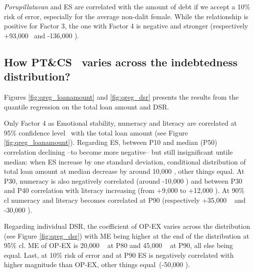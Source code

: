 \documentclass[a4paper, 11pt, onecolumn]{article}
\newcommand{\sd}{standard deviation}
\newcommand{\aebe}{all else being equal}
\newcommand{\ote}{other things equal}
\newcommand{\cl}{confidence level}
\newcommand{\PTCS}{PT\&CS}
\begin{document}
\textit{Porupillatavan} and ES are correlated with the amount of debt if we accept a 10\% risk of error, especially for the average non-dalit female.
While the relationship is positive for Factor 3, the one with Factor 4 is negative and stronger (respectively +93,000 \rupee~and -136,000 \rupee).



	\subsection{How \PTCS~ varies across the indebtedness distribution?}

Figures \ref{fig:qreg_loanamount} and \ref{fig:qreg_dsr} presents the results from the quantile regression on the total loan amount and DSR.

Only Factor 4 as Emotional stability, numeracy and literacy are correlated at 95\% \cl~ with the total loan amount (see Figure \ref{fig:qreg_loanamount}).
Regarding ES, between P10 and median (P50) correlation declining --to become more negative-- but still insignificant untile median: when ES increase by one \sd, conditional distribution of total loan amount at median decrease by around 10,000 \rupee, \ote.
At P30, numeracy is also negatively correlated (around -10,000 \rupee) and between P30 and P40 correlation with literacy increasing (from +9,000 to +12,000 \rupee).
At 90\% cl numeracy and literacy becomes correlated at P90 (respectively +35,000 \rupee~ and -30,000 \rupee).

Regarding individual DSR, the coefficient of OP-EX varies across the distribution (see Figure \ref{fig:qreg_dsr}) with ME being higher at the end of the distribution at 95\% cl.
ME of OP-EX is 20,000 \rupee~ at P80 and 45,000 \rupee~ at P90, \aebe.
Last, at 10\% risk of error and at P90 ES is negatively correlated with higher magnitude than OP-EX, \ote~(-50,000 \rupee).






\end{document}

